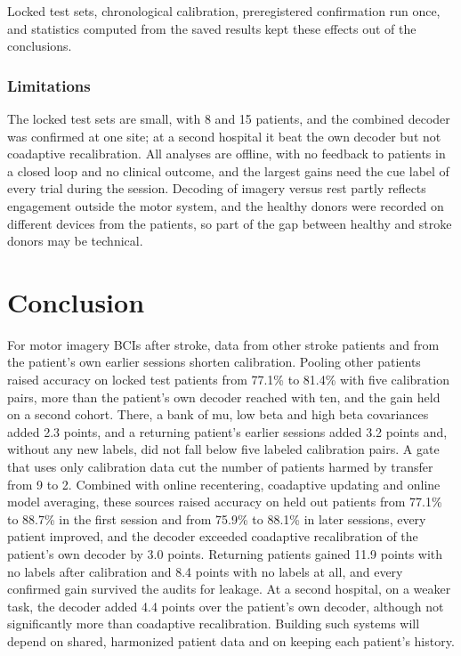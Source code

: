 \documentclass{ieeeaccess}
\begin{document}
Locked test sets, chronological calibration, preregistered confirmation run once, and statistics computed from the saved results kept these effects out of the conclusions.

\subsubsection{Limitations} The locked test sets are small, with 8 and 15 patients, and the combined decoder was confirmed at one site; at a second hospital it beat the own decoder but not coadaptive recalibration. All analyses are offline, with no feedback to patients in a closed loop and no clinical outcome, and the largest gains need the cue label of every trial during the session. Decoding of imagery versus rest partly reflects engagement outside the motor system, and the healthy donors were recorded on different devices from the patients, so part of the gap between healthy and stroke donors may be technical.

\section{Conclusion}\label{sec:conclusion}

For motor imagery BCIs after stroke, data from other stroke patients and from the patient's own earlier sessions shorten calibration. Pooling other patients raised accuracy on locked test patients from 77.1\% to 81.4\% with five calibration pairs, more than the patient's own decoder reached with ten, and the gain held on a second cohort. There, a bank of mu, low beta and high beta covariances added 2.3 points, and a returning patient's earlier sessions added 3.2 points and, without any new labels, did not fall below five labeled calibration pairs. A gate that uses only calibration data cut the number of patients harmed by transfer from 9 to 2. Combined with online recentering, coadaptive updating and online model averaging, these sources raised accuracy on held out patients from 77.1\% to 88.7\% in the first session and from 75.9\% to 88.1\% in later sessions, every patient improved, and the decoder exceeded coadaptive recalibration of the patient's own decoder by 3.0 points. Returning patients gained 11.9 points with no labels after calibration and 8.4 points with no labels at all, and every confirmed gain survived the audits for leakage. At a second hospital, on a weaker task, the decoder added 4.4 points over the patient's own decoder, although not significantly more than coadaptive recalibration. Building such systems will depend on shared, harmonized patient data and on keeping each patient's history.
\end{document}
